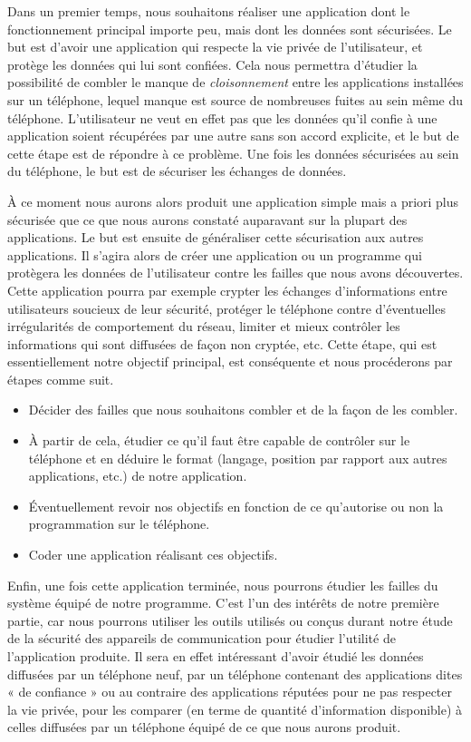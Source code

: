 \documentclass[a4paper, 12pt,twoside]{article}
\begin{document}
		Dans un premier temps, nous souhaitons réaliser une application dont le fonctionnement principal importe peu, mais dont les données sont sécurisées. Le but est d'avoir une application qui respecte la vie privée de l'utilisateur, et protège les données qui lui sont confiées. Cela nous permettra d'étudier la possibilité de combler le manque de \emph{cloisonnement} entre les applications installées sur un téléphone, lequel manque est source de nombreuses fuites au sein même du téléphone. L'utilisateur ne veut en effet pas que les données qu'il confie à une application soient récupérées par une autre sans son accord explicite, et le but de cette étape est de répondre à ce problème. Une fois les données sécurisées au sein du téléphone, le but est de sécuriser les échanges de données.
		
		À ce moment nous aurons alors produit une application simple mais a priori plus sécurisée que ce que nous aurons constaté auparavant sur la plupart des applications. Le but est ensuite de généraliser cette sécurisation aux autres applications. Il s'agira alors de créer une application ou un programme qui protègera les données de l'utilisateur contre les failles que nous avons découvertes. Cette application pourra par exemple crypter les échanges d'informations entre utilisateurs soucieux de leur sécurité, protéger le téléphone contre d'éventuelles irrégularités de comportement du réseau, limiter et mieux contrôler les informations qui sont diffusées de façon non cryptée, etc. Cette étape, qui est essentiellement notre objectif principal, est conséquente et nous procéderons par étapes comme suit.
		
		\begin{itemize}\setlength{\parskip}{0pt}
			\item Décider des failles que nous souhaitons combler et de la façon de les combler.
			\item À partir de cela, étudier ce qu'il faut être capable de contrôler sur le téléphone et en déduire le format (langage, position par rapport aux autres applications, etc.) de notre application.
			\item Éventuellement revoir nos objectifs en fonction de ce qu'autorise ou non la programmation sur le téléphone.
			\item Coder une application réalisant ces objectifs.
		\end{itemize}
		
		Enfin, une fois cette application terminée, nous pourrons étudier les failles du système équipé de notre programme. C'est l'un des intérêts de notre première partie, car nous pourrons utiliser les outils utilisés ou conçus durant notre étude de la sécurité des appareils de communication pour étudier l'utilité de l'application produite. Il sera en effet intéressant d'avoir étudié les données diffusées par un téléphone neuf, par un téléphone contenant des applications dites «  de confiance  » ou au contraire des applications réputées pour ne pas respecter la vie privée, pour les comparer (en terme de quantité d'information disponible) à celles diffusées par un téléphone équipé de ce que nous aurons produit.
		
\end{document}
